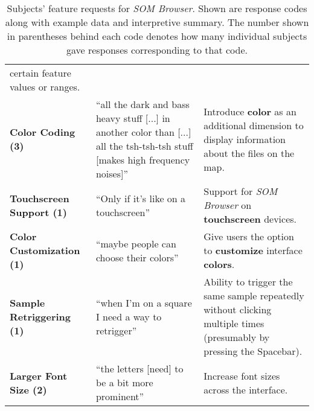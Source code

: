 \begin{table}[!htb]
{\begin{tabular}{ p{4.0cm} p{4.75cm} p{4.75cm} }
    certain feature values or ranges.
    \\
    \textbf{Color Coding (3)}
    &
    ``all the dark and bass heavy stuff [...] in another color than [...] all the
    tsh-tsh-tsh stuff [makes high frequency noises]''
    &
    Introduce \textbf{color} as an additional dimension to display information
    about the files on the map.
    \\
    \textbf{Touchscreen Support (1)}
    &
    ``Only if it's like on a touchscreen''
    &
    Support for \textit{SOM Browser} on \textbf{touchscreen} devices.
    \\
    \textbf{Color Customization (1)}
    &
    ``maybe people can choose their colors''
    &
    Give users the option to \textbf{customize} interface \textbf{colors}.
    \\
    \textbf{Sample Retriggering (1)}
    &
    ``when I'm on a square I need a way to retrigger''
    &
    Ability to trigger the same sample repeatedly without clicking multiple
    times (presumably by pressing the Spacebar).
    \\
    \textbf{Larger Font Size (2)}
    &
    ``the letters [need] to be a bit more prominent''
    &
    Increase font sizes across the interface.
    \\
  \end{tabular}}
  \caption[\textit{SOM Browser}: Feature Requests]{Subjects' feature requests
  for \textit{SOM Browser}. Shown are response codes along with example data and
  interpretive summary. The number shown in parentheses behind each code denotes
  how many individual subjects gave responses corresponding to that code.}
  \label{table:responses_feature_requests}
\end{table}
